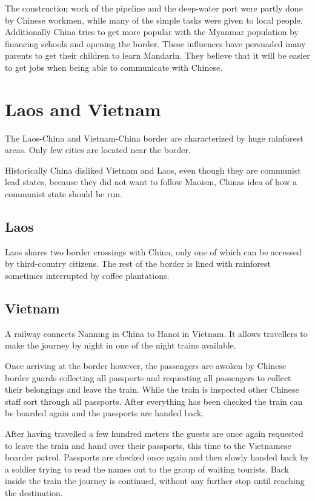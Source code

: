 \documentclass[conference]{IEEEtran}
\begin{document}
	The construction work of the pipeline and the deep-water port were partly done by Chinese workmen, while many of the simple tasks were given to local people. Additionally China tries to get more popular with the Myanmar population by financing schools and opening the border. These influences have persuaded many parents to get their children to learn Mandarin. They believe that it will be easier to get jobs when being able to communicate with Chinese.
	
	\section{Laos and Vietnam}
	The Laos-China and Vietnam-China border are characterized by huge rainforest areas. Only few cities are located near the border.
	
	Historically China disliked Vietnam and Laos, even though they are communist lead states, because they did not want to follow Maoism, Chinas idea of how a communist state should be run.
	
	\subsection{Laos}
	Laos shares two border crossings with China, only one of which can be accessed by third-country citizens. The rest of the border is lined with rainforest sometimes interrupted by coffee plantations.
	
	\subsection{Vietnam}
	A railway connects Nanning in China to Hanoi in Vietnam. It allows travellers to make the journey by night in one of the night trains available.
	
	Once arriving at the border however, the passengers are awoken by Chinese border guards collecting all passports and requesting all passengers to collect their belongings and leave the train. While the train is inspected other Chinese staff sort through all passports. After everything has been checked the train can be boarded again and the passports are handed back.
	
	After having travelled a few hundred meters the guests are once again requested to leave the train and hand over their passports, this time to the Vietnamese boarder patrol. Passports are checked once again and then slowly handed back by a soldier trying to read the names out to the group of waiting tourists. Back inside the train the journey is continued, without any further stop until reaching the destination.
	
\end{document}
